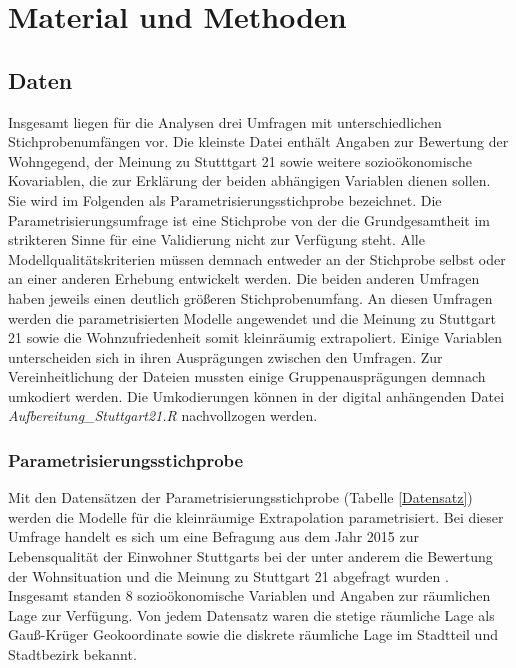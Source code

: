 \documentclass{Vorlage}
\begin{document}
\newpage

\section{Material und Methoden}
\subsection{Daten}
Insgesamt liegen für die Analysen drei Umfragen mit unterschiedlichen Stichprobenumfängen vor. Die kleinste Datei 
enthält Angaben zur Bewertung der Wohngegend, der Meinung zu Stutttgart 21 sowie weitere sozioökonomische Kovariablen, 
die zur Erklärung der beiden abhängigen Variablen dienen sollen. Sie wird im Folgenden als 
Parametrisierungsstichprobe bezeichnet. Die Parametrisierungsumfrage ist eine Stichprobe von 
der die Grundgesamtheit im strikteren Sinne für eine Validierung nicht zur Verfügung steht. Alle Modellqualitätskriterien müssen 
demnach entweder an der Stichprobe selbst oder an einer anderen Erhebung entwickelt werden. Die beiden anderen 
Umfragen haben jeweils einen deutlich größeren Stichprobenumfang. An diesen Umfragen werden die parametrisierten 
Modelle angewendet und die Meinung zu Stuttgart 21 sowie die Wohnzufriedenheit somit kleinräumig extrapoliert. Einige 
Variablen unterscheiden sich in ihren Ausprägungen zwischen den Umfragen. Zur Vereinheitlichung der Dateien mussten 
einige Gruppenausprägungen demnach umkodiert werden. Die Umkodierungen können in der digital anhängenden Datei 
\textit{Aufbereitung\_Stuttgart21.R} nachvollzogen werden.

\subsubsection{Parametrisierungsstichprobe}
Mit den Datensätzen der Parametrisierungsstichprobe (Tabelle \ref{Datensatz}) werden die Modelle für die kleinräumige 
Extrapolation parametrisiert. Bei dieser Umfrage handelt es sich um eine Befragung aus dem Jahr 2015 zur Lebensqualität 
der Einwohner Stuttgarts bei der unter anderem die Bewertung der Wohnsituation und die Meinung zu Stuttgart 21 abgefragt 
wurden \cite{Stuttgart2015}. Insgesamt standen 8 sozioökonomische Variablen und Angaben zur räumlichen Lage zur 
Verfügung. Von jedem Datensatz waren die stetige räumliche Lage als Gauß-Krüger Geokoordinate sowie die diskrete räumliche 
Lage im Stadtteil und Stadtbezirk bekannt.\\
\end{document}
